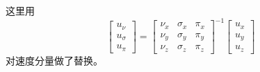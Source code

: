 这里用
\begin{equation}
\begin{bmatrix}u_{\nu}\\
u_{\sigma}\\
u_{\pi}
\end{bmatrix}=\begin{bmatrix}\nu_{x} & \sigma_{x} & \pi_{x}\\
\nu_{y} & \sigma_{y} & \pi_{y}\\
\nu_{z} & \sigma_{z} & \pi_{z}
\end{bmatrix}^{-1}\begin{bmatrix}u_{x}\\
u_{y}\\
u_{z}
\end{bmatrix}
\end{equation}
对速度分量做了替换。

